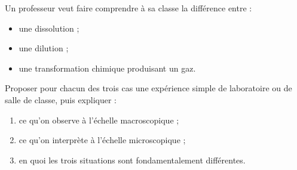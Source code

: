 \documentclass[11pt,a4paper]{article}
\begin{document}
\begin{enoncebox}
Un professeur veut faire comprendre à sa classe la différence entre :
\begin{itemize}
    \item une dissolution ;
    \item une dilution ;
    \item une transformation chimique produisant un gaz.
\end{itemize}

Proposer pour chacun des trois cas une expérience simple de laboratoire ou de salle de classe, puis expliquer :
\begin{enumerate}[label=\arabic*)]
    \item ce qu'on observe à l'échelle macroscopique ;
    \item ce qu'on interprète à l'échelle microscopique ;
    \item en quoi les trois situations sont fondamentalement différentes.
\end{enumerate}
\end{enoncebox}
\end{document}
